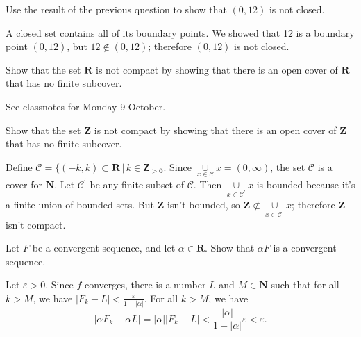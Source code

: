 \documentclass[12pt, fleqn]{exam}
\newcommand{\reals}{\mathbf{R}}
\newcommand{\integers}{\mathbf{Z}}
\begin{document}
\begin{questions}
\begin{solution}
\end{solution}

\question  Use the result of the previous question to show that \((0,12)\) is not
closed.

\begin{solution}%
A closed set contains all of its boundary points. We showed that 12 is a boundary point \((0,12)\), but
\(12 \notin (0,12)\); therefore \((0,12)\) is not closed.
\end{solution}


\question  Show that the set \(\reals\) is not compact by 
showing that there is an open cover of \( \reals \) that has no
finite subcover.

\begin{solution} See classnotes for Monday 9 October.

\end{solution}

\question  Show that the set \(\mathbf{Z}\) is not compact by 
showing that there is an open cover of \( \mathbf{Z} \) that has no
finite subcover.

\begin{solution}%
  Define \(\mathcal{C} = \{(-k,k) \subset \reals \, | \, k \in \mathbf{\integers_{>0}}\). Since 
  \(\underset{x \in \mathcal{C}}{\cup} x = (0,\infty)\), the set \(\mathcal{C}\)
is a cover for  \(\mathbf{N}\). Let  \(\mathcal{C}^\prime\) be any finite subset
of  \(\mathcal{C}\). Then \(\underset{x \in \mathcal{C}^\prime}{\cup} x\) is
bounded because it's a finite union of bounded sets.  But \(\mathbf{\integers}\) isn't
bounded, so \(\mathbf{\integers} \not \subset \underset{x \in \mathcal{C}^\prime}{\cup} x\);
therefore \(\mathbf{\integers}\) isn't compact.
\end{solution}


\question Let \(F\) be a convergent sequence, and let \(\alpha \in
\reals\).  Show that \(\alpha F\) is a convergent sequence.



\begin{solution}%
Let \(\varepsilon > 0\). Since \(f\) converges, there is a number \(L\) and 
\(M \in \mathbf{N}\) such that for all \(k > M\), we have \(|F_k - L| < \frac{\varepsilon}{1 + |\alpha|}\).
For all \(k > M\), we have
\[
  |\alpha F_k - \alpha L| = |\alpha| |F_k - L|
                          < \frac{ |\alpha|}{1 + |\alpha|} \varepsilon
                          < \varepsilon.
\]


\end{solution}
\end{questions}
\end{document}
